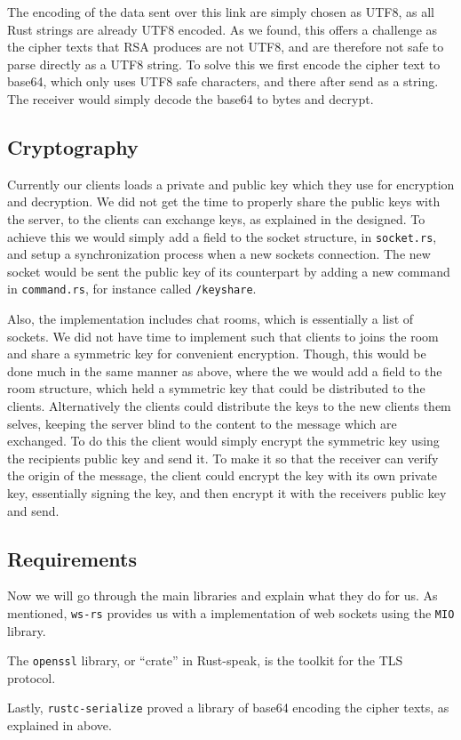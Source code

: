 The encoding of the data sent over this link are simply chosen as
UTF8, as all Rust strings are already UTF8 encoded. As we found, this
offers a challenge as the cipher texts that RSA produces are not UTF8,
and are therefore not safe to parse directly as a UTF8 string. To
solve this we first encode the cipher text to base64, which only uses
UTF8 safe characters, and there after send as a string. The receiver
would simply decode the base64 to bytes and decrypt.


\subsection{Cryptography}
Currently our clients loads a private and public key which they use
for encryption and decryption. We did not get the time to properly
share the public keys with the server, to the clients can exchange
keys, as explained in the designed. To achieve this we would simply
add a field to the socket structure, in {\tt socket.rs}, and setup a
synchronization process when a new sockets connection. The new socket
would be sent the public key of its counterpart by adding a new
command in {\tt command.rs}, for instance called {\tt /keyshare}.

Also, the implementation includes chat rooms, which is essentially a
list of sockets. We did not have time to implement such that clients
to joins the room and share a symmetric key for convenient
encryption. Though, this would be done much in the same manner as
above, where the we would add a field to the room structure, which
held a symmetric key that could be distributed to the
clients. Alternatively the clients could distribute the keys to the
new clients them selves, keeping the server blind to the content to
the message which are exchanged. To do this the client would simply
encrypt the symmetric key using the recipients public key and send
it. To make it so that the receiver can verify the origin of the
message, the client could encrypt the key with its own private key,
essentially signing the key, and then encrypt it with the receivers
public key and send.


\subsection{Requirements}
Now we will go through the main libraries and explain what they do for
us. As mentioned, {\tt ws-rs} provides us with a implementation of
web sockets using
the {\tt MIO} library.

The {\tt openssl} library, or ``crate'' in Rust-speak, is the
toolkit for the TLS protocol.

Lastly, {\tt rustc-serialize} proved a library of base64 encoding the
cipher texts, as explained in above.


